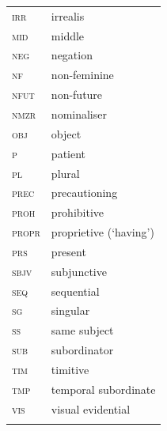 \documentclass[output=paper,colorlinks,citecolor=brown
]{langscibook}
\begin{document}
\begin{tabularx}{.5\textwidth}{@{}lQ@{}}
\textsc{irr} & irrealis \\
\textsc{mid} & middle \\
\textsc{neg} & negation \\
\textsc{nf} & non-feminine \\
\textsc{nfut} & non-future \\
\textsc{nmzr} & nominaliser \\
\textsc{obj} & object \\
\textsc{p} & patient \\
\textsc{pl} & plural \\
\textsc{prec} & precautioning \\
\textsc{proh} & prohibitive \\
\textsc{propr} & proprietive (`having') \\
\textsc{prs} & present \\
\textsc{sbjv} & subjunctive \\
\textsc{seq} & sequential \\
\textsc{sg} & singular \\
\textsc{ss} & same subject \\
\textsc{sub} & subordinator  \\
\textsc{tim} & timitive \\
\textsc{tmp} & temporal subordinate \\
\textsc{vis} & visual evidential \\
\\
\end{tabularx}


\sloppy
\printbibliography[heading=subbibliography,notkeyword=this]
\end{document}
